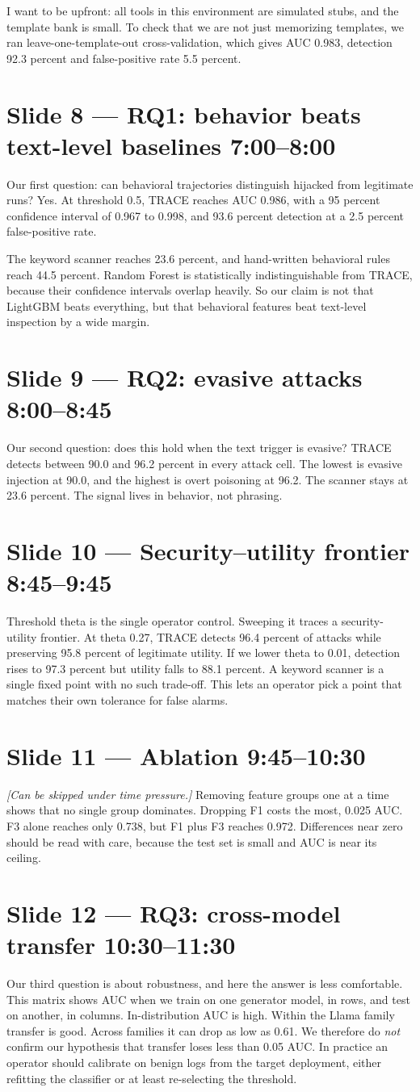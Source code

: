 \documentclass[11pt]{article}
\newcommand{\slide}[3]{\section*{Slide #1 --- #2 \hfill {\normalsize\color{gray}#3}}}
\newcommand{\cue}[1]{{\color{ieeeblue}\itshape [#1]}}
\begin{document}
I want to be upfront: all tools in this environment are simulated stubs, and the template bank is small. To check that we are not just memorizing templates, we ran leave-one-template-out cross-validation, which gives AUC 0.983, detection 92.3 percent and false-positive rate 5.5 percent.

\slide{8}{RQ1: behavior beats text-level baselines}{7:00--8:00}
Our first question: can behavioral trajectories distinguish hijacked from legitimate runs? Yes. At threshold 0.5, TRACE reaches AUC 0.986, with a 95 percent confidence interval of 0.967 to 0.998, and 93.6 percent detection at a 2.5 percent false-positive rate.

The keyword scanner reaches 23.6 percent, and hand-written behavioral rules reach 44.5 percent. Random Forest is statistically indistinguishable from TRACE, because their confidence intervals overlap heavily. So our claim is not that LightGBM beats everything, but that behavioral features beat text-level inspection by a wide margin.

\slide{9}{RQ2: evasive attacks}{8:00--8:45}
Our second question: does this hold when the text trigger is evasive? TRACE detects between 90.0 and 96.2 percent in every attack cell. The lowest is evasive injection at 90.0, and the highest is overt poisoning at 96.2. The scanner stays at 23.6 percent. The signal lives in behavior, not phrasing.

\slide{10}{Security--utility frontier}{8:45--9:45}
Threshold theta is the single operator control. Sweeping it traces a security-utility frontier. At theta 0.27, TRACE detects 96.4 percent of attacks while preserving 95.8 percent of legitimate utility. If we lower theta to 0.01, detection rises to 97.3 percent but utility falls to 88.1 percent. A keyword scanner is a single fixed point with no such trade-off. This lets an operator pick a point that matches their own tolerance for false alarms.

\slide{11}{Ablation}{9:45--10:30}
\cue{Can be skipped under time pressure.} Removing feature groups one at a time shows that no single group dominates. Dropping F1 costs the most, 0.025 AUC. F3 alone reaches only 0.738, but F1 plus F3 reaches 0.972. Differences near zero should be read with care, because the test set is small and AUC is near its ceiling.

\slide{12}{RQ3: cross-model transfer}{10:30--11:30}
Our third question is about robustness, and here the answer is less comfortable. This matrix shows AUC when we train on one generator model, in rows, and test on another, in columns. In-distribution AUC is high. Within the Llama family transfer is good. Across families it can drop as low as 0.61. We therefore do \emph{not} confirm our hypothesis that transfer loses less than 0.05 AUC. In practice an operator should calibrate on benign logs from the target deployment, either refitting the classifier or at least re-selecting the threshold.
\end{document}
